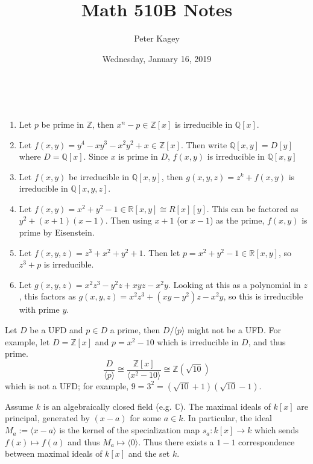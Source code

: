 \documentclass{article}
\newenvironment{example}[1][Example.]{
  \begin{trivlist} \item[\hskip \labelsep {\bfseries #1}]
}{\end{trivlist}}
\newenvironment{theorem}[1][Theorem.]{
  \begin{trivlist} \item[\hskip \labelsep {\bfseries #1}]
}{\end{trivlist}}
\newcommand{\ang}[1]{\langle #1 \rangle}
\newcommand{\fn}[3]{#1 \colon #2 \rightarrow #3}
\begin{document}
\title{Math 510B Notes}
\author{Peter Kagey}
\date{Wednesday, January 16, 2019}

\maketitle

\begin{example}[Examples.] ~
  \begin{enumerate}
    \item Let $p$ be prime in $\mathbb Z$, then $x^n - p \in \mathbb Z[x]$ is
    irreducible in $\mathbb Q[x]$.
    \item Let $f(x, y) = y^4 - xy^3 - x^2y^2 + x \in \mathbb Z[x]$. Then write
    $\mathbb Q[x, y] = D[y]$ where $D = \mathbb Q[x]$. Since $x$ is prime in
    $D$, $f(x, y)$ is irreducible in $\mathbb Q[x, y]$
    \item Let $f(x, y)$ be irreducible in $\mathbb Q[x, y]$, then
    $g(x, y, z) = z^k + f(x, y)$ is irreducible in $\mathbb Q[x, y, z]$.
    \item Let $f(x, y) = x^2 + y^2 - 1 \in \mathbb R[x, y] \cong R[x][y]$. This
    can be factored as $y^2 + (x+1)(x-1)$. Then using $x+1$ (or $x-1$) as the
    prime, $f(x, y)$ is prime by Eisenstein.
    \item Let $f(x, y, z) = z^3 + x^2 + y^2 + 1$.
    Then let $p = x^2 + y^2 - 1 \in \mathbb R[x, y]$, so $z^3 + p$ is
    irreducible.
    \item Let $g(x, y, z) = x^2z^3 - y^2z + xyz - x^2 y$. Looking at this as a
    polynomial in $z$, this factors as
    $g(x, y, z) = x^2z^3 + (xy - y^2)z - x^2y$, so this is irreducible with
    prime $y$.
  \end{enumerate}
\end{example}
\begin{example}
  Let $D$ be a UFD and $p \in D$ a prime, then $D/\ang p$ might not be a UFD.
  For example, let $D = \mathbb Z[x]$ and $p = x^2 - 10$ which is irreducible in
  $D$, and thus prime. \[
    \frac{D}{\ang p} \cong \frac{\mathbb Z[x]}{\ang{x^2 - 10}} \cong \mathbb Z(\sqrt{10})
  \] which is not a UFD; for example, $9 = 3^2 = (\sqrt{10} + 1)(\sqrt{10} - 1)$.
\end{example}
\begin{theorem}[Lemma.]
  Assume $k$ is an algebraically closed field (e.g. $\mathbb C$).
  The maximal ideals of $k[x]$ are principal, generated by $(x-a)$ for some
  $a \in k$. In particular, the ideal $M_a := \ang{x - a}$ is the kernel of
  the specialization map $\fn{s_a}{k[x]}{k}$ which sends $f(x) \mapsto f(a)$ and
  thus $M_a \mapsto \ang 0$. Thus there exists a $1-1$ correspondence between
  maximal ideals of $k[x]$ and the set $k$.
\end{theorem}
\end{document}
